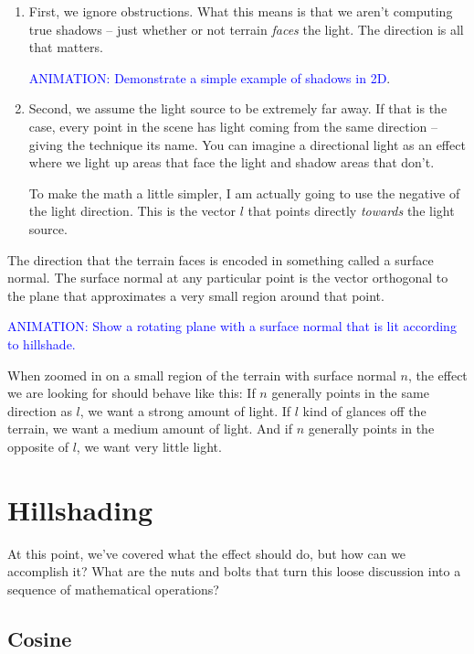 \documentclass{article}
\newcommand\animation[1]{\textcolor{blue}{ANIMATION: #1}}
\begin{document}
\begin{enumerate}
	
\item First, we ignore obstructions.
What this means is that we aren't computing true shadows -- just whether or not terrain \textit{faces} the light.
The direction is all that matters.

\animation{Demonstrate a simple example of shadows in 2D}.
	
\item Second, we assume the light source to be extremely far away.
If that is the case, every point in the scene has light coming from the same direction -- giving the technique its name.
You can imagine a directional light as an effect where we light up areas that face the light and shadow areas that don't.

To make the math a little simpler, I am actually going to use the negative of the light direction.
This is the vector $l$ that points directly \textit{towards} the light source.

\end{enumerate}

The direction that the terrain faces is encoded in something called a surface normal.
The surface normal at any particular point is the vector orthogonal to the plane that approximates a very small region around that point.

\animation{Show a rotating plane with a surface normal that is lit according to hillshade.}

When zoomed in on a small region of the terrain with surface normal $n$, the effect we are looking for should behave like this:
If $n$ generally points in the same direction as $l$, we want a strong amount of light.
If $l$ kind of glances off the terrain, we want a medium amount of light.
And if $n$ generally points in the opposite of $l$, we want very little light.

\section{Hillshading}

At this point, we've covered what the effect should do, but how can we accomplish it?
What are the nuts and bolts that turn this loose discussion into a sequence of mathematical operations?

\subsection{Cosine}
\end{document}
